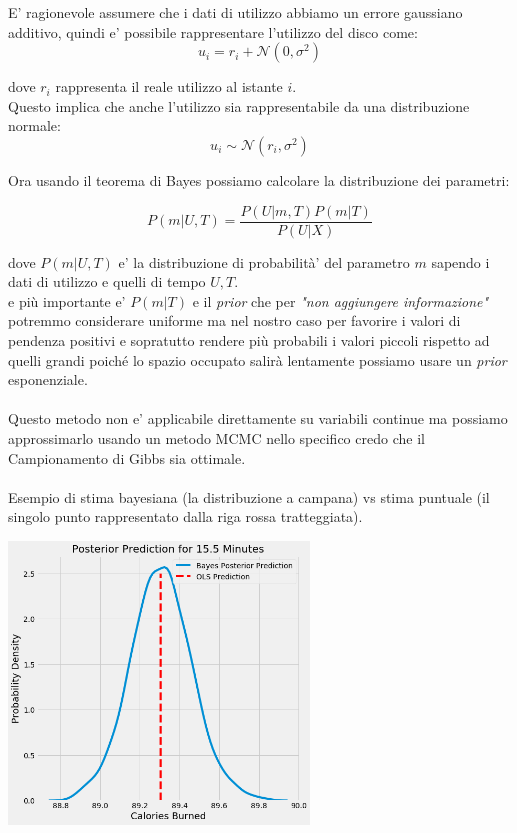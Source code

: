 \documentclass{article}
\begin{document}
E' ragionevole assumere che i dati di utilizzo abbiamo un errore gaussiano additivo, quindi e' possibile rappresentare l'utilizzo del disco come:
\[u_i = r_i + \mathcal{N}(0, \sigma^2)\]

dove \(r_i\) rappresenta il reale utilizzo al istante \(i\).
\\
Questo implica che anche l'utilizzo sia rappresentabile da una distribuzione normale:
\[u_i \sim \mathcal{N}(r_i, \sigma^2)\]

Ora usando il teorema di Bayes possiamo calcolare la distribuzione dei parametri:

\[P(m | U, T) = \frac{P( U | m, T) P(m | T)}{P(U | X)}\]

dove \(P(m | U, T) \) e' la distribuzione di probabilità' del parametro \(m\) sapendo i dati di utilizzo e quelli di tempo \(U, T\).\\

e più importante e' \(P(m | T)\) e il \textit{prior} che per \textit{"non aggiungere informazione"} potremmo considerare uniforme ma nel nostro caso per favorire i valori di pendenza positivi e sopratutto rendere più probabili i valori piccoli rispetto ad quelli grandi poiché lo spazio occupato salirà lentamente possiamo usare un \textit{prior} esponenziale.\\\\
Questo metodo non e' applicabile direttamente su variabili continue ma possiamo approssimarlo usando un metodo MCMC nello specifico credo che il Campionamento di Gibbs sia ottimale.
\\\\
Esempio di stima bayesiana (la distribuzione a campana) vs stima puntuale (il singolo punto rappresentato dalla riga rossa tratteggiata).

\begin{center}
    \includegraphics[width=8cm]{imgs/BvsF.png}
\end{center}
\end{document}
